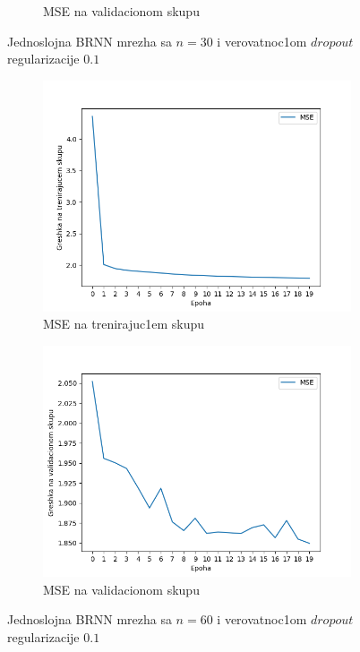 \documentclass[a4paper, openany, oneside, 11pt]{book}
\begin{document}
\begin{figure}[!h]
\begin{subfigure}{0.475\textwidth}
            \caption{\acrshort{MSE} na validacionom skupu}
            \label{fig:4_11b}
            \vspace{0pt}
        \end{subfigure}
        \caption{Jednoslojna \acrshort{BRNN} mrezha sa $n=30$ i verovatnoc1om $dropout$ regularizacije $0.1$}
        \label{fig:4_11}
\end{figure}
\begin{figure}[!h]
        \centering
        \begin{subfigure}{0.475\textwidth}
            \centering
            \includegraphics[scale=0.43]{res/SL_BLSTM_60units_d01_train.png}
            \caption{\acrshort{MSE} na trenirajuc1em skupu}
            \label{fig:4_12a}
            \vspace{0pt}
        \end{subfigure}%
        \begin{subfigure}{0.475\textwidth}
            \centering
            \includegraphics[scale=0.43]{res/SL_BLSTM_60units_d01_validation.png}
            \caption{\acrshort{MSE} na validacionom skupu}
            \label{fig:4_12b}
            \vspace{0pt}
        \end{subfigure}
        \caption{Jednoslojna \acrshort{BRNN} mrezha sa $n=60$ i verovatnoc1om $dropout$ regularizacije $0.1$}
        \label{fig:4_12}
\end{figure}
\end{document}
